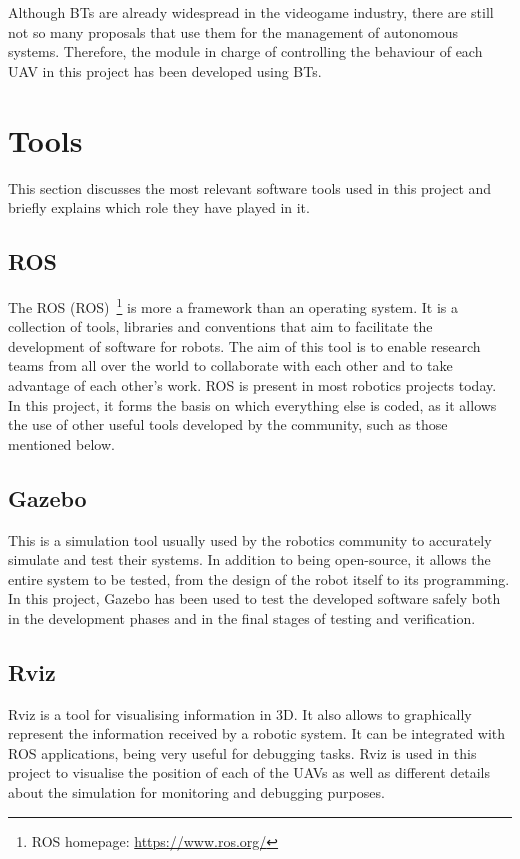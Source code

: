 Although \glspl{BT} are already widespread in the videogame industry, there are still not so many proposals that use them for the management of autonomous systems. Therefore, the module in charge of controlling the behaviour of each \gls{UAV} in this project has been developed using \glspl{BT}.

\section{Tools}
\label{sec:Tools}
This section discusses the most relevant software tools used in this project and briefly explains which role they have played in it.

\subsection{ROS}
\label{subsec:ROS}
The \acrlong{ROS} (\acrshort{ROS})~\footnote{ROS homepage: \url{https://www.ros.org/}} is more a framework than an operating system. It is a collection of tools, libraries and conventions that aim to facilitate the development of software for robots. The aim of this tool is to enable research teams from all over the world to collaborate with each other and to take advantage of each other's work. \gls{ROS} is present in most robotics projects today. In this project, it forms the basis on which everything else is coded, as it allows the use of other useful tools developed by the community, such as those mentioned below.

\subsection{Gazebo}
\label{subsec:Gazebo}
This is a simulation tool usually used by the robotics community to accurately simulate and test their systems. In addition to being open-source, it allows the entire system to be tested, from the design of the robot itself to its programming. In this project, Gazebo has been used to test the developed software safely both in the development phases and in the final stages of testing and verification.

\subsection{Rviz}
\label{subsec:Rviz}
Rviz is a tool for visualising information in 3D. It also allows to graphically represent the information received by a robotic system. It can be integrated with ROS applications, being very useful for debugging tasks. Rviz is used in this project to visualise the position of each of the UAVs as well as different details about the simulation for monitoring and debugging purposes.

